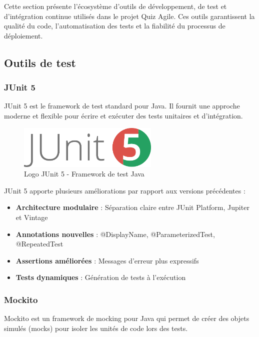 \documentclass[12pt,a4paper]{report}
\begin{document}
Cette section présente l'écosystème d'outils de développement, de test et d'intégration continue utilisés dans le projet Quiz Agile. Ces outils garantissent la qualité du code, l'automatisation des tests et la fiabilité du processus de déploiement.

\subsection{Outils de test}

\subsubsection{JUnit 5}

JUnit 5 est le framework de test standard pour Java. Il fournit une approche moderne et flexible pour écrire et exécuter des tests unitaires et d'intégration.

\begin{figure}[htbp]
    \centering
    \includegraphics[width=0.6\textwidth]{latex_media/media/junit.png}
    \caption{Logo JUnit 5 - Framework de test Java}
    \label{fig:junit-logo}
\end{figure}

JUnit 5 apporte plusieurs améliorations par rapport aux versions précédentes :
\begin{itemize}
    \item \textbf{Architecture modulaire} : Séparation claire entre JUnit Platform, Jupiter et Vintage
    \item \textbf{Annotations nouvelles} : @DisplayName, @ParameterizedTest, @RepeatedTest
    \item \textbf{Assertions améliorées} : Messages d'erreur plus expressifs
    \item \textbf{Tests dynamiques} : Génération de tests à l'exécution
\end{itemize}

\subsubsection{Mockito}

Mockito est un framework de mocking pour Java qui permet de créer des objets simulés (mocks) pour isoler les unités de code lors des tests.
\end{document}
